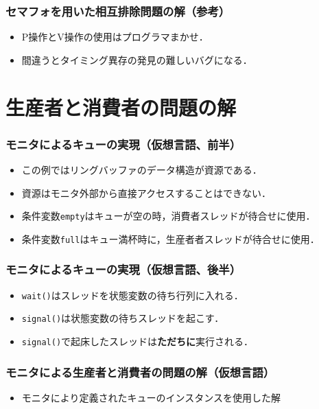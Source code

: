\documentclass[dvipdfmx]{beamer}
\begin{document}
\begin{frame}
  \frametitle{セマフォを用いた相互排除問題の解（参考）}
  

  \begin{itemize}
  \item P操作とV操作の使用はプログラマまかせ．
  \item 間違うとタイミング異存の発見の難しいバグになる．
  \end{itemize}
\end{frame}

\section{生産者と消費者の問題の解}
\begin{frame}
  \frametitle{モニタによるキューの実現（仮想言語、前半）}
  

  \begin{itemize}
  \item この例ではリングバッファのデータ構造が資源である．
  \item 資源はモニタ外部から直接アクセスすることはできない．
  \item 条件変数{\tt empty}はキューが空の時，消費者スレッドが待合せに使用．
  \item 条件変数{\tt full}はキュー満杯時に，生産者者スレッドが待合せに使用．
  \end{itemize}
\end{frame}

\begin{frame}
  \frametitle{モニタによるキューの実現（仮想言語、後半）}
  

  \begin{itemize}
  \item {\tt wait()}はスレッドを状態変数の待ち行列に入れる．
  \item {\tt signal()}は状態変数の待ちスレッドを起こす．
  \item {\tt signal()}で起床したスレッドは{\bf ただちに}実行される．
  \end{itemize}
\end{frame}

\begin{frame}
  \frametitle{モニタによる生産者と消費者の問題の解（仮想言語）}
  

  \begin{itemize}
  \item モニタにより定義されたキューのインスタンスを使用した解
  \end{itemize}
\end{frame}
\end{document}
